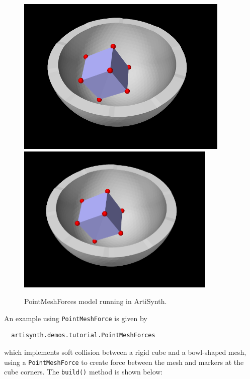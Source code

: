 \begin{figure}[h]
\begin{center}
\iflatexml
 \includegraphics[]{images/PointMeshForces}
\else
 \includegraphics[width=3.75in]{images/PointMeshForces}
\fi
\end{center}
\caption{PointMeshForces model running in ArtiSynth.}
\label{PointMeshForces:fig}
\end{figure}

An example using {\tt PointMeshForce} is given by
%
\begin{verbatim}
  artisynth.demos.tutorial.PointMeshForces
\end{verbatim}
%
which implements soft collision between a rigid cube and a bowl-shaped mesh,
using a {\tt PointMeshForce} to create force between the mesh and markers at
the cube corners. The {\tt build()} method is shown below:
%
\lstset{numbers=left}
\iflatexml

\else

\fi
\lstset{numbers=none}
%

